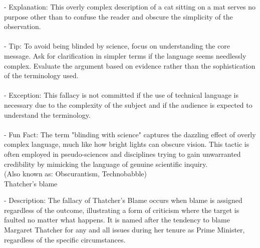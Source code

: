 \documentclass[a4paper,12pt,single,pdftex]{scrbook}
\begin{document}
    
        - Explanation: This overly complex description of a cat sitting on a mat serves no purpose other than to confuse the reader and obscure the simplicity of the observation.
    \\

    
      
    \\

    
      - Tip: To avoid being blinded by science, focus on understanding the core message. Ask for clarification in simpler terms if the language seems needlessly complex. Evaluate the argument based on evidence rather than the sophistication of the terminology used.
    \\

    
      
    \\

    
      - Exception: This fallacy is not committed if the use of technical language is necessary due to the complexity of the subject and if the audience is expected to understand the terminology.
    \\

    
      
    \\

    
      - Fun Fact: The term "blinding with science" captures the dazzling effect of overly complex language, much like how bright lights can obscure vision. This tactic is often employed in pseudo-sciences and disciplines trying to gain unwarranted credibility by mimicking the language of genuine scientific inquiry.
    \\

  
    
      (Also known as: Obscurantism, Technobabble)
    \\

  

Thatcher’s blame
    
      - Description: The fallacy of Thatcher’s Blame occurs when blame is assigned regardless of the outcome, illustrating a form of criticism where the target is faulted no matter what happens. It is named after the tendency to blame Margaret Thatcher for any and all issues during her tenure as Prime Minister, regardless of the specific circumstances.
    \\

    
      
    \\
\end{document}
